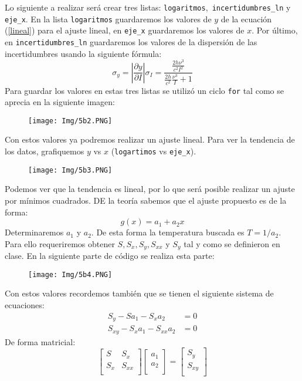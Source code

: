 \documentclass[11pt]{article}
\begin{document}
	Lo siguiente a realizar será crear tres listas: \texttt{logaritmos},\texttt{ incertidumbres\_ln} y \texttt{eje\_x}. En la lista \texttt{logaritmos} guardaremos los valores de $y$ de la ecuación (\ref{lineal}) para el ajuste lineal, en \texttt{eje\_x} guardaremos los valores de $x$. Por último, en \texttt{incertidumbres\_ln} guardaremos los valores de la dispersión de las incertidumbres usando la siguiente fórmula:
	$$\sigma_y = \left|\frac{\partial y}{\partial I}\right| \sigma_I = \frac{\frac{2h\nu^3}{c^2 I^2}}{\frac{2h}{c^2}\frac{\nu^3}{I} + 1}$$
	Para guardar los valores en estas tres listas se utilizó un ciclo \texttt{for} tal como se aprecia en la siguiente imagen:
	\begin{figure}[h]
		\centering
		\texttt{[image: Img/5b2.PNG]}
	\end{figure}
	
	Con estos valores ya podremos realizar un ajuste lineal. Para ver la tendencia de los datos, grafiquemos $y$ vs $x$ (\texttt{logartimos} vs \texttt{eje\_x}). 
\newpage
	\begin{figure}[h]
		\centering
		\texttt{[image: Img/5b3.PNG]}
	\end{figure}
	
	Podemos ver que la tendencia es lineal, por lo que será posible realizar un ajuste por mínimos cuadrados. DE la teoría sabemos que el ajuste propuesto es de la forma:
	$$g(x) = a_1 + a_2 x$$
	Determinaremos $a_1$ y $a_2$. De esta forma la temperatura buscada es $T=1/a_2$. Para ello requeriremos obtener $S,S_x, S_y, S_{xx}$ y $S_y$ tal y como se definieron en clase. En la siguiente parte de código se realiza esta parte:
	\begin{figure}[h]
		\centering
		\texttt{[image: Img/5b4.PNG]}
	\end{figure}
	
	Con estos valores recordemos también que se tienen el siguiente sistema de ecuaciones:
	\begin{align*}
		S_y - S a_1 -S_x a_2	&= 0	\\
		S_{xy} -S_x a_1 -S_{xx} a_2 &= 0
	\end{align*}
	De forma matricial:
	$$\left[ {\begin{array}{cc}
			S & S_x \\
			S_x & S_{xx} \\
	\end{array} } \right] \left[ {\begin{array}{c}
	a_1   \\
	a_2   \\
\end{array} } \right]	= 
  \left[ {\begin{array}{c}
		S_y  \\
		S_{xy}  \\
\end{array} } \right]
$$
\end{document}
